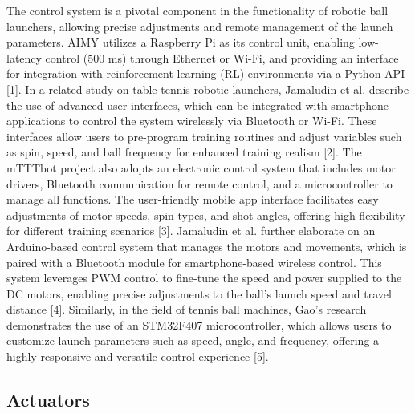 \documentclass[12pt]{report}
\begin{document}
The control system is a pivotal component in the functionality of robotic ball launchers, allowing precise adjustments and remote management of the launch parameters. AIMY utilizes a Raspberry Pi as its control unit, enabling low-latency control (500 ms) through Ethernet or Wi-Fi, and providing an interface for integration with reinforcement learning (RL) environments via a Python API [1]. In a related study on table tennis robotic launchers, Jamaludin et al. describe the use of advanced user interfaces, which can be integrated with smartphone applications to control the system wirelessly via Bluetooth or Wi-Fi. These interfaces allow users to pre-program training routines and adjust variables such as spin, speed, and ball frequency for enhanced training realism [2]. The mTTTbot project also adopts an electronic control system that includes motor drivers, Bluetooth communication for remote control, and a microcontroller to manage all functions. The user-friendly mobile app interface facilitates easy adjustments of motor speeds, spin types, and shot angles, offering high flexibility for different training scenarios [3]. Jamaludin et al. further elaborate on an Arduino-based control system that manages the motors and movements, which is paired with a Bluetooth module for smartphone-based wireless control. This system leverages PWM control to fine-tune the speed and power supplied to the DC motors, enabling precise adjustments to the ball’s launch speed and travel distance [4]. Similarly, in the field of tennis ball machines, Gao’s research demonstrates the use of an STM32F407 microcontroller, which allows users to customize launch parameters such as speed, angle, and frequency, offering a highly responsive and versatile control experience [5].

\subsection{Actuators}
\end{document}
